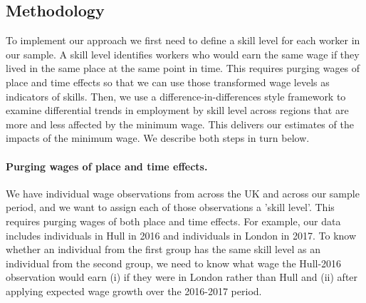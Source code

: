 \subsection{Methodology}\label{sec:lm_implementation} 

To implement our approach we first need to define a skill level for each worker in our sample. A skill level identifies workers who would earn the same wage if they lived in the same place at the same point in time. This requires purging wages of place and time effects so that we can use those transformed wage levels as indicators of skills. Then, we use a difference-in-differences style framework to examine differential trends in employment by skill level across regions that are more and less affected by the minimum wage. This delivers our estimates of the impacts of the minimum wage. We describe both steps in turn below.  

\paragraph{Purging wages of place and time effects.} We have individual wage observations from across the UK and across our sample period, and we want to assign each of those observations a 'skill level'. This requires purging wages of both place and time effects. For example, our data includes individuals in Hull in 2016 and individuals in London in 2017. To know whether an individual from the first group has the same skill level as an individual from the second group, we need to know what wage the Hull-2016 observation would earn (i) if they were in London rather than Hull and (ii) after applying expected wage growth over the 2016-2017 period.


